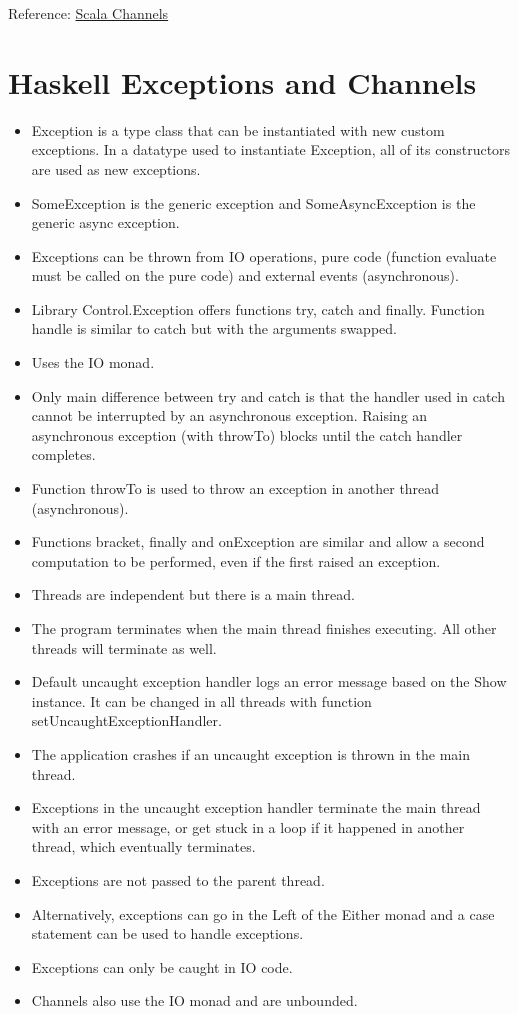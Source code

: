 \documentclass[a4paper,11pt]{article}
\theoremstyle{plain}
\theoremstyle{nonumberplain}
\begin{document}
Reference: \href{https://softwaremill.com/go-like-channels-using-project-loom-and-scala/}{Scala Channels}

\section{Haskell Exceptions and Channels}

\begin{itemize}
  \item Exception is a type class that can be instantiated with new custom exceptions. In a datatype used to instantiate Exception, all of its constructors are used as new exceptions.
  \item SomeException is the generic exception and SomeAsyncException is the generic async exception.
  \item Exceptions can be thrown from IO operations, pure code (function evaluate must be called on the pure code) and external events (asynchronous).
  \item Library Control.Exception offers functions try, catch and finally. Function handle is similar to catch but with the arguments swapped.
  \item Uses the IO monad.
  \item Only main difference between try and catch is that the handler used in catch cannot be interrupted by an asynchronous exception. Raising an asynchronous exception (with throwTo) blocks until the catch handler completes.
  \item Function throwTo is used to throw an exception in another thread (asynchronous).
  \item Functions bracket, finally and onException are similar and allow a second computation to be performed, even if the first raised an exception.
  \item Threads are independent but there is a main thread.
  \item The program terminates when the main thread finishes executing. All other threads will terminate as well.
  \item Default uncaught exception handler logs an error message based on the Show instance. It can be changed in all threads with function setUncaughtExceptionHandler.
  \item The application crashes if an uncaught exception is thrown in the main thread.
  \item Exceptions in the uncaught exception handler terminate the main thread with an error message, or get stuck in a loop if it happened in another thread, which eventually terminates.
  \item Exceptions are not passed to the parent thread.
  \item Alternatively, exceptions can go in the Left of the Either monad and a case statement can be used to handle exceptions.
  \item Exceptions can only be caught in IO code.
  \item Channels also use the IO monad and are unbounded.
\end{itemize}
\end{document}
